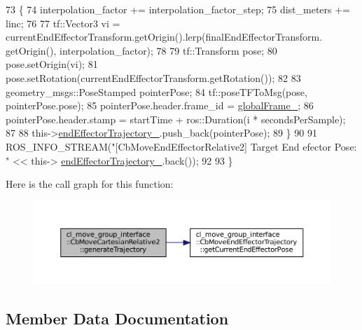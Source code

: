\begin{DoxyCode}
73             \{
74                 interpolation\_factor += interpolation\_factor\_step;
75                 dist\_meters += linc;
76 
77                 tf::Vector3 vi = currentEndEffectorTransform.getOrigin().lerp(finalEndEffectorTransform.
      getOrigin(), interpolation\_factor);
78 
79                 tf::Transform pose;
80                 pose.setOrigin(vi);
81                 pose.setRotation(currentEndEffectorTransform.getRotation());
82 
83                 geometry\_msgs::PoseStamped pointerPose;
84                 tf::poseTFToMsg(pose, pointerPose.pose);
85                 pointerPose.header.frame\_id = \hyperlink{classcl__move__group__interface_1_1CbMoveCartesianRelative2_ac33f1b3f077e191cda9b0b5f9f8c1f34}{globalFrame\_};
86                 pointerPose.header.stamp = startTime + ros::Duration(i * secondsPerSample);
87 
88                 this->\hyperlink{classcl__move__group__interface_1_1CbMoveEndEffectorTrajectory_ae13dfd31ea3660646e03882f0c2c29f0}{endEffectorTrajectory\_}.push\_back(pointerPose);
89             \}
90 
91             ROS\_INFO\_STREAM(\textcolor{stringliteral}{"[CbMoveEndEffectorRelative2] Target End efector Pose: "} << this->
      \hyperlink{classcl__move__group__interface_1_1CbMoveEndEffectorTrajectory_ae13dfd31ea3660646e03882f0c2c29f0}{endEffectorTrajectory\_}.back());
92 
93         \}
\end{DoxyCode}
Here is the call graph for this function\+:
\nopagebreak
\begin{figure}[H]
\begin{center}
\leavevmode
\includegraphics[width=350pt]{classcl__move__group__interface_1_1CbMoveCartesianRelative2_a6ba51647d197e874a87289a90ff8e0f1_cgraph}
\end{center}
\end{figure}


\subsection{Member Data Documentation}
\mbox{\label{classcl__move__group__interface_1_1CbMoveCartesianRelative2_ac33f1b3f077e191cda9b0b5f9f8c1f34}} 
